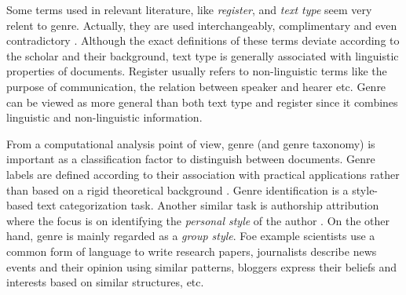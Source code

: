 Some terms used in relevant literature, like \textit{register}, and \textit{text type} seem very relent to genre. Actually, they are used interchangeably, complimentary and even contradictory \parencite{melissourgou2017genre}. Although the exact definitions of these terms deviate according to the scholar and their background, text type is generally associated with linguistic properties of documents. Register usually refers to non-linguistic terms like the purpose of communication, the relation between speaker and hearer etc. Genre can be viewed as more general than both text type and register since it combines linguistic and non-linguistic information. 




From a computational analysis point of view, genre (and genre taxonomy) is important as a classification factor to distinguish between documents. Genre labels are defined according to their association with practical applications rather than based on a rigid theoretical background \parencite{kanaris2009learning,santini2007automatic}. Genre identification is a style-based text categorization task. Another similar task is authorship attribution where the focus is on identifying the \textit{personal style} of the author \parencite{stamatatos2009survey,koppel2011authorship,koppel2014determining}. On the other hand, genre is mainly regarded as a \textit{group style}. Foe example scientists use a common form of language to write research papers, journalists describe news events and their opinion using similar patterns, bloggers express their beliefs and interests based on similar structures, etc.

